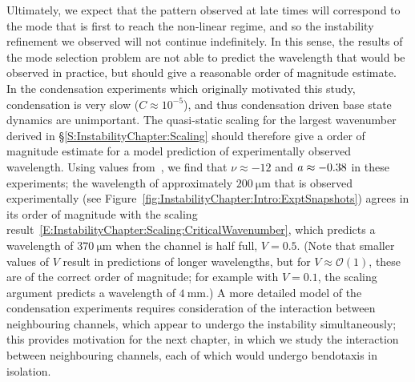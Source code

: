 Ultimately, we expect that the pattern observed at late times will correspond to the mode that is first to reach the non-linear regime, and so the instability refinement we observed will not continue indefinitely. In this sense, the results of the mode selection problem are not able to predict the wavelength that would be observed in practice, but should give a reasonable order of magnitude estimate. In the condensation experiments which originally motivated this study, condensation is very slow ($C \approx 10^{-5}$), and thus condensation driven base state dynamics are unimportant. The quasi-static scaling for the largest wavenumber derived in \S\ref{S:InstabilityChapter:Scaling} should therefore give a order of magnitude estimate for a model prediction of experimentally observed wavelength. Using values from~\cite{Seemann2011JPhysCondMat}, we find that $\nu \approx -12$ and $a \approx -0.38$ in these experiments; the wavelength of approximately $200~\si{\micro \meter}$ that is observed experimentally (see Figure~\ref{fig:InstabilityChapter:Intro:ExptSnapshots}) agrees in its order of magnitude with the scaling result~\eqref{E:InstabilityChapter:Scaling:CriticalWavenumber}, which predicts a wavelength of $370~\si{\micro \meter}$ when the channel is half full, $V = 0.5$. (Note that smaller values of $V$ result in predictions of longer wavelengths, but for $V \approx \mathcal{O}(1)$, these are of the correct order of magnitude; for example with $V = 0.1$, the scaling argument predicts a wavelength of $4~\si{\milli \meter}$.) A more detailed model of the condensation experiments requires consideration of the interaction between neighbouring channels, which appear to undergo the instability simultaneously; this provides motivation for the next chapter, in which we study the interaction between neighbouring channels, each of which would undergo bendotaxis in isolation.

